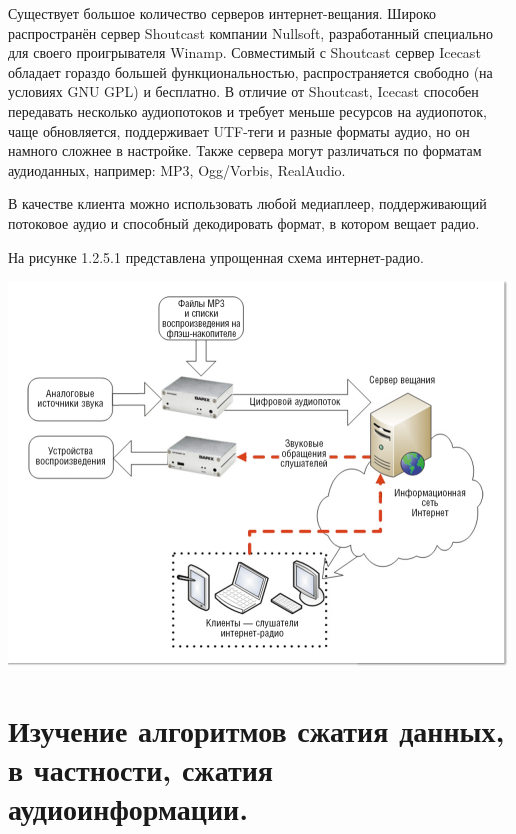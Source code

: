 \documentclass[a4paper]{report}
\begin{document}
Существует большое количество серверов интернет-вещания. Широко распространён сервер Shoutcast компании Nullsoft, разработанный специально для своего проигрывателя Winamp. Совместимый с Shoutcast сервер Icecast обладает гораздо большей функциональностью, распространяется свободно (на условиях GNU GPL) и бесплатно. В отличие от Shoutcast, Icecast способен передавать несколько аудиопотоков и требует меньше ресурсов на аудиопоток, чаще обновляется, поддерживает UTF-теги и разные форматы аудио, но он намного сложнее в настройке. Также сервера могут различаться по форматам аудиоданных, например: MP3, Ogg/Vorbis, RealAudio.

В качестве клиента можно использовать любой медиаплеер, поддерживающий потоковое аудио и способный декодировать формат, в котором вещает радио.

На рисунке 1.2.5.1 представлена упрощенная схема интернет-радио.

\includegraphics[scale=0.9]{internet_radio}
{\\}



\newpage
\chapter{Изучение алгоритмов сжатия данных, в частности, сжатия
аудиоинформации.}
\end{document}
